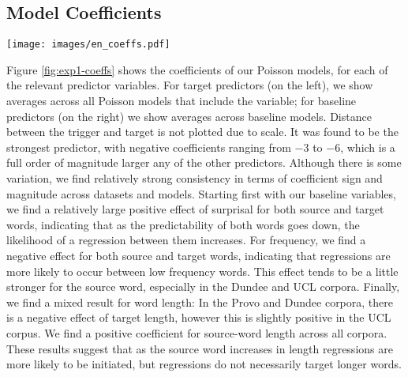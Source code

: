 \documentclass[12pt]{article}
\begin{document}
\subsection{Model Coefficients}

\begin{figure*}[t]
    \centering
    \begin{minipage}{0.95\textwidth}
    \centering
    \small
    \texttt{[image: images/en\_coeffs.pdf]}
    \vspace{-0.8cm}
    \caption{\small \textbf{Model Coefficients:} Scaled estimates for model coefficients. Error bars are 95\% CIs across 10 folds of data. Results are similar across corpora. Distance between source and target, which has an extremely strong negative estimate is not plotted due to scale.}
    \label{fig:exp1-coeffs}
    \end{minipage}
\end{figure*}

Figure \ref{fig:exp1-coeffs} shows the coefficients of our Poisson models, for each of the relevant predictor variables. For target predictors (on the left), we show averages across all Poisson models that include the variable; for baseline predictors (on the right) we show averages across baseline models. Distance between the trigger and target is not plotted due to scale. It was found to be the strongest predictor, with negative coefficients ranging from $-3$ to $-6$, which is a full order of magnitude larger any of the other predictors. Although there is some variation, we find relatively strong consistency in terms of coefficient sign and magnitude across datasets and models. Starting first with our baseline variables, we find a relatively large positive effect of surprisal for both source and target words, indicating that as the predictability of both words goes down, the likelihood of a regression between them increases. For frequency, we find a negative effect for both source and target words, indicating that regressions are more likely to occur between low frequency words. This effect tends to be a little stronger for the source word, especially in the Dundee and UCL corpora. Finally, we find a mixed result for word length: In the Provo and Dundee corpora, there is a negative effect of target length, however this is slightly positive in the UCL corpus. We find a positive coefficient for source-word length across all corpora. These results suggest that as the source word increases in length regressions are more likely to be initiated, but regressions do not necessarily target longer words.
\end{document}
